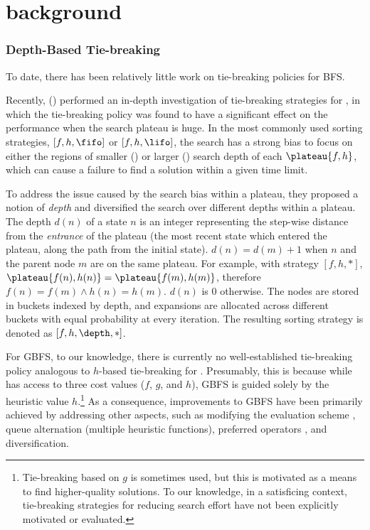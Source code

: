 \section{background}

\subsubsection{Depth-Based Tie-breaking}

To date, there has been relatively little work on 
tie-breaking policies for BFS.

Recently, \citeauthor{Asai2016} (\citeyear{Asai2016}) performed an in-depth investigation
of tie-breaking strategies for \astar, in which
the tie-breaking policy was found to have a
significant effect on the performance when the search plateau is huge.
In the most commonly used  sorting strategies, $[f,h,\fifo]$ or $[f,h,\lifo]$, the search has a strong bias to focus on  either the regions of smaller (\fifo) or larger (\lifo) search depth of each $\plateau{f,h}$, which can cause a failure to find a solution within a given time limit.

To address the issue caused by the search bias within a plateau,
they proposed a notion of \emph{depth} and diversified the search over different depths
within a plateau. The depth $d(n)$ of a state $n$ is an integer representing 
the step-wise distance from the \emph{entrance} of the plateau (the most recent state which
entered the plateau, along the path from the initial state). 
% 
$d(n)=d(m)+1$ when $n$ and the parent node $m$ are on the same plateau.
For example, with strategy $[f,h,*]$, 
$\plateau{f(n),h(n)}=\plateau{f(m),h(m)}$, therefore
$f(n) = f(m) \land h(n) = h(m)$.
$d(n)$ is 0 otherwise.
The nodes are stored in buckets indexed by depth, and expansions are allocated across different buckets with equal probability at every iteration.
The resulting sorting strategy is denoted as $[f,h,\depth,*]$.

For GBFS, to our knowledge, there is currently no
well-established tie-breaking policy analogous to $h$-based tie-breaking for \astar.
Presumably, this is  because
while \astar has access to three cost values ($f$, $g$, and $h$),
GBFS is guided solely by the heuristic value $h$.\footnote{Tie-breaking based on  $g$ is sometimes used, but this is motivated as a means to find higher-quality solutions. To our knowledge, in a satisficing context, tie-breaking strategies for reducing search effort have not been explicitly motivated or evaluated.} 
As a consequence,
improvements to  GBFS have been primarily achieved by addressing other aspects, such as
modifying the evaluation scheme \cite[lazy evaluation]{richter2010lama}, queue alternation
(multiple heuristic functions), preferred operators \cite{hoffmann01}, and diversification.

